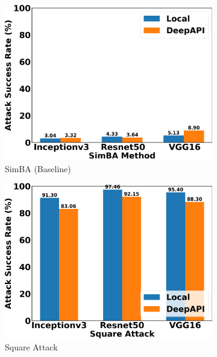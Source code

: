 \begin{figure}[bth]
\centering
\begin{subfigure}[b]{0.31\textwidth}
    \centering
    \includegraphics[width=\textwidth]{figures/chapter_classification/simba_attack_success_rate.png}
    \caption{SimBA (Baseline)}
    \label{fig:simba_suc}
\end{subfigure}
\hfill
\begin{subfigure}[b]{0.31\textwidth}
    \centering
    \includegraphics[width=\textwidth]{figures/chapter_classification/square_attack_success_rate.png}
    \caption{Square Attack}
    \label{fig:square_suc}
\end{subfigure}
\hfill
\begin{subfigure}[b]{0.31\textwidth}

\end{subfigure}
\end{figure}
